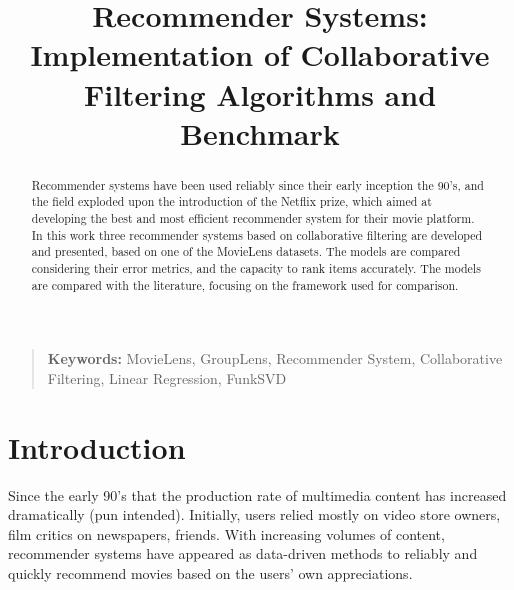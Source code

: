 \documentclass[conference]{IEEEtran}
\begin{document}
\title{Recommender Systems: Implementation of Collaborative Filtering Algorithms and Benchmark}

\author{
\and
{}
}

\maketitle
\thispagestyle{plain}

\begin{abstract}
Recommender systems have been used reliably since their early inception the 90's, and the field exploded upon the introduction of the Netflix prize, which aimed at developing the best and most efficient recommender system for their movie platform. In this work three recommender systems based on collaborative filtering are developed and presented, based on one of the MovieLens datasets. The models are compared considering their error metrics, and the capacity to rank items accurately. The models are compared with the literature, focusing on the framework used for comparison. 
\end{abstract}

\begin{quote}
\small
\noindent
\textbf{Keywords:} MovieLens, GroupLens, Recommender System, Collaborative Filtering, Linear Regression, FunkSVD
\end{quote}

\IEEEpeerreviewmaketitle


\section{Introduction}

Since the early 90's that the production rate of multimedia content has increased dramatically (pun intended). Initially, users relied mostly on video store owners, film critics on newspapers, friends. With increasing volumes of content, recommender systems have appeared as data-driven methods to reliably and quickly recommend movies based on the users' own appreciations.
\end{document}
